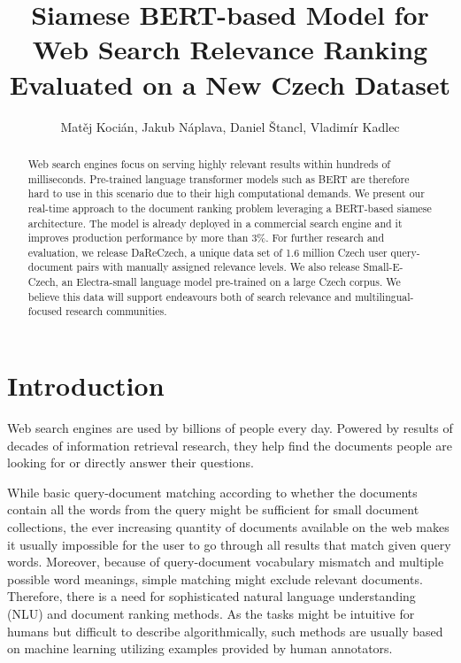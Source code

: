 \documentclass[letterpaper]{article} \usepackage{aaai22 }  \usepackage{times}  \usepackage{helvet}  \usepackage{courier}  \usepackage[hyphens]{url}  \usepackage{graphicx} \usepackage{amsmath,amsfonts,amssymb, mathabx,bm,bbm}
\title{Siamese BERT-based Model for Web Search Relevance Ranking\\ Evaluated on a New Czech Dataset}
\author{
Matěj Kocián\equalcontrib, Jakub Náplava\equalcontrib, Daniel Štancl\equalcontrib, Vladimír Kadlec
}
\begin{document}

\maketitle


\begin{abstract}
Web search engines focus on serving highly relevant results within hundreds of milliseconds. Pre-trained language transformer models such as BERT are therefore hard to use in this scenario due to their high computational demands. We present our real-time approach to the document ranking problem leveraging a BERT-based siamese architecture. The model is already deployed in a commercial search engine and it improves production performance by more than 3\%. For further research and evaluation, we release DaReCzech, a unique data set of 1.6 million Czech user query-document pairs with manually assigned relevance levels. We also release Small-E-Czech, an Electra-small language model pre-trained on a large Czech corpus. We believe this data will support endeavours both of search relevance and multilingual-focused research communities.
\end{abstract}

\section{Introduction}


Web search engines are used by billions of people every day. Powered by results of decades of information retrieval research, they help find the documents people are looking for or directly answer their questions.

While basic query-document matching according to whether the documents contain all the words from the query might be sufficient for small document collections, the ever increasing quantity of documents available on the web makes it usually impossible for the user to go through all results that match given query words. Moreover, because of query-document vocabulary mismatch \cite{zhao_query_mismatch} and multiple possible word meanings, simple matching might exclude relevant documents. Therefore, there is a need for sophisticated natural language understanding (NLU) and document ranking methods. As the tasks might be intuitive for humans but difficult to describe algorithmically, such methods are usually based on machine learning utilizing examples provided by human annotators.
\end{document}
